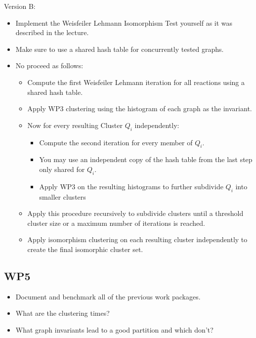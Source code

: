 \documentclass[a4,12pt]{article}
\theoremstyle{plain}
\numberwithin{theorem}{section}
\begin{document}
Version B:
\begin{itemize}
\item Implement the Weisfeiler Lehmann Isomorphism Test yourself as it was described in the lecture.
\item Make sure to use a shared hash table for concurrently tested graphs.
\item No proceed as follows:
   \begin{itemize}
   \item Compute the first Weisfeiler Lehmann  iteration for all reactions using a shared hash table. 
   \item Apply WP3 clustering using the histogram of each graph as the invariant.
   \item Now for every resulting Cluster $Q_i$ independently:
       \begin{itemize}
        \item Compute the second iteration for every member of $Q_i$.
        \item You may use an independent copy of the hash table from the last step only shared for $Q_i$.
        \item Apply WP3 on the resulting histograms to further subdivide $Q_i$ into smaller clusters  
       \end{itemize}
   \item Apply this procedure recursively to subdivide clusters until a threshold cluster size or a maximum number of iterations is reached. 
   \item Apply isomorphism clustering on each resulting cluster independently to create the final isomorphic cluster set.
   \end{itemize}
\end{itemize}


\subsection{WP5}

\begin{itemize}
\item Document and benchmark all of the previous work packages.
\item What are the clustering times?
\item What graph invariants lead to a good partition and which don't?
\end{itemize}


%
%
\end{document}
